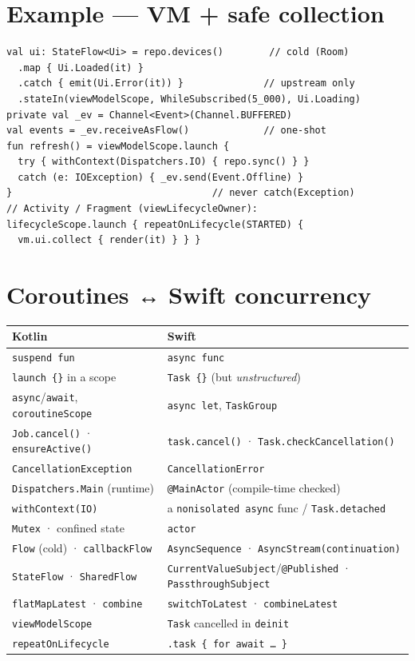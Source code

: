 \documentclass[8pt]{extarticle}
\begin{document}
\begin{multicols}{2}
\section{Example — VM + safe collection}
\begin{lstlisting}[language=KotlinSheet]
val ui: StateFlow<Ui> = repo.devices()        // cold (Room)
  .map { Ui.Loaded(it) }
  .catch { emit(Ui.Error(it)) }              // upstream only
  .stateIn(viewModelScope, WhileSubscribed(5_000), Ui.Loading)
private val _ev = Channel<Event>(Channel.BUFFERED)
val events = _ev.receiveAsFlow()             // one-shot
fun refresh() = viewModelScope.launch {
  try { withContext(Dispatchers.IO) { repo.sync() } }
  catch (e: IOException) { _ev.send(Event.Offline) }
}                                   // never catch(Exception)
// Activity / Fragment (viewLifecycleOwner):
lifecycleScope.launch { repeatOnLifecycle(STARTED) {
  vm.ui.collect { render(it) } } }
\end{lstlisting}

\columnbreak

\section{Coroutines ↔ Swift concurrency}
{\scriptsize
\noindent\begin{tabularx}{\linewidth}{@{}>{\raggedright\arraybackslash}p{34mm}L@{}}
\toprule
\textbf{Kotlin} & \textbf{Swift} \\
\midrule
\texttt{suspend fun} & \texttt{async func} \\
\texttt{launch \{\}} in a scope & \texttt{Task \{\}} (but \emph{unstructured}) \\
\texttt{async}/\texttt{await}, \texttt{coroutineScope} & \texttt{async let}, \texttt{TaskGroup} \\
\texttt{Job.cancel()} · \texttt{ensureActive()} & \texttt{task.cancel()} ·
  \texttt{Task.checkCancellation()} \\
\texttt{CancellationException} & \texttt{CancellationError} \\
\texttt{Dispatchers.Main} (runtime) & \texttt{@MainActor} (compile-time checked) \\
\texttt{withContext(IO)} & a \texttt{nonisolated async} func / \texttt{Task.detached} \\
\texttt{Mutex} · confined state & \texttt{actor} \\
\texttt{Flow} (cold) · \texttt{callbackFlow} & \texttt{AsyncSequence} ·
  \texttt{AsyncStream(continuation)} \\
\texttt{StateFlow} · \texttt{SharedFlow} & \texttt{CurrentValueSubject}/\texttt{@Published} ·
  \texttt{PassthroughSubject} \\
\texttt{flatMapLatest} · \texttt{combine} & \texttt{switchToLatest} · \texttt{combineLatest} \\
\texttt{viewModelScope} & \texttt{Task} cancelled in \texttt{deinit} \\
\texttt{repeatOnLifecycle} & \texttt{.task \{ for await … \}} \\
\bottomrule
\end{tabularx}}


\end{multicols}
\end{document}

